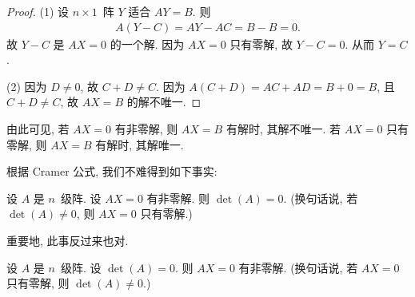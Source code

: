 \begin{proof}
    (1)
    设 \(n \times 1\)~阵 \(Y\) 适合 \(AY = B\).
    则
    \begin{align*}
        A(Y - C) = AY - AC = B - B = 0.
    \end{align*}
    故 \(Y - C\) 是 \(AX = 0\) 的一个解.
    因为 \(AX = 0\) 只有零解,
    故 \(Y - C = 0\).
    从而 \(Y = C\).



    (2)
    因为 \(D \neq 0\), 故 \(C + D \neq C\).
    因为 \(A(C + D) = AC + AD = B + 0 = B\),
    且 \(C + D \neq C\),
    故 \(AX = B\) 的解不唯一.
\end{proof}

由此可见, 若 \(AX = 0\) 有非零解,
则 \(AX = B\) 有解时,
其解不唯一.
若 \(AX = 0\) 只有零解,
则 \(AX = B\) 有解时,
其解唯一.

根据 Cramer 公式, 我们不难得到如下事实:

\begin{theorem}
    设 \(A\) 是 \(n\)~级阵.
    设 \(AX = 0\) 有非零解.
    则 \(\det {(A)} = 0\).
    (换句话说,
    若 \(\det {(A)} \neq 0\),
    则 \(AX = 0\) 只有零解.)
\end{theorem}

重要地, 此事反过来也对.

\begin{theorem}
    设 \(A\) 是 \(n\)~级阵.
    设 \(\det {(A)} = 0\).
    则 \(AX = 0\) 有非零解.
    (换句话说,
    若 \(AX = 0\) 只有零解,
    则 \(\det {(A)} \neq 0\).)
\end{theorem}


